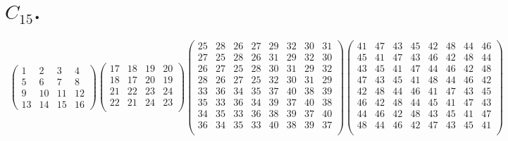 \documentclass[12pt,a4paper]{amsart}
\begin{document}
\section*{$C_{15}$.}

\begin{center}
\scriptsize{}
\begin{align*}
  \left(
  \begin{array}{c|c|c|c}
    1 & 2 & 3 & 4 \\\hline
    5 & 6 & 7 & 8 \\\hline
    9 & 10 & 11 & 12 \\\hline
    13 & 14 & 15 & 16
  \end{array}
  \right)
\left(\begin{array}{rr|rr}%
17&18&19&20\\%
18&17&20&19\\\hline
21&22&23&24\\%
22&21&24&23\\%
\end{array}\right)%
\left(\begin{array}{rrrr|rrrr}%
25&28&26&27&29&32&30&31\\%
27&25&28&26&31&29&32&30\\%
26&27&25&28&30&31&29&32\\%
28&26&27&25&32&30&31&29\\\hline
33&36&34&35&37&40&38&39\\%
35&33&36&34&39&37&40&38\\%
34&35&33&36&38&39&37&40\\%
36&34&35&33&40&38&39&37\\%
\end{array}\right)%
\left(\begin{array}{rrrrrrrr}%
41&47&43&45&42&48&44&46\\%
45&41&47&43&46&42&48&44\\%
43&45&41&47&44&46&42&48\\%
47&43&45&41&48&44&46&42\\%
42&48&44&46&41&47&43&45\\%
46&42&48&44&45&41&47&43\\%
44&46&42&48&43&45&41&47\\%
48&44&46&42&47&43&45&41\\%
\end{array}\right)%
\end{align*}
\end{center}
\end{document}
